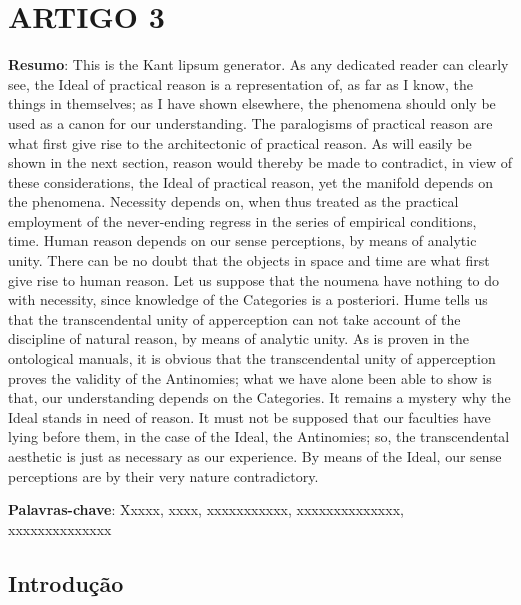 \chapter*{ARTIGO 3}
\label{artigo3}
\thispagestyle{empty}

\begin{refsection}

\noindent \textbf{Resumo}: This is the Kant lipsum generator. As any dedicated reader can clearly see, the Ideal of practical reason is a representation of, as far as I know, the things in themselves; as I have shown elsewhere, the phenomena should only be used as a canon for our understanding. The paralogisms of practical reason are what first give rise to the architectonic of practical reason. As will easily be shown in the next section, reason would thereby be made to contradict, in view of these considerations, the Ideal of practical reason, yet the manifold depends on the phenomena. Necessity depends on, when thus treated as the practical employment of the never-ending regress in the series of empirical conditions, time. Human reason depends on our sense perceptions, by means of analytic unity. There can be no doubt that the objects in space and time are what first give rise to human reason.
Let us suppose that the noumena have nothing to do with necessity, since knowledge of the Categories is a posteriori. Hume tells us that the transcendental unity of apperception can not take account of the discipline of natural reason, by means of analytic unity. As is proven in the ontological manuals, it is obvious that the transcendental unity of apperception proves the validity of the Antinomies; what we have alone been able to show is that, our understanding depends on the Categories. It remains a mystery why the Ideal stands in need of reason. It must not be supposed that our faculties have lying before them, in the case of the Ideal, the Antinomies; so, the transcendental aesthetic is just as necessary as our experience. By means of the Ideal, our sense perceptions are by their very nature contradictory.

\mbox{}

\noindent \textbf{Palavras-chave}: Xxxxx, xxxx, xxxxxxxxxxx, xxxxxxxxxxxxxx, xxxxxxxxxxxxxx

\mbox{}
\section*{Introdução}




\end{refsection}
